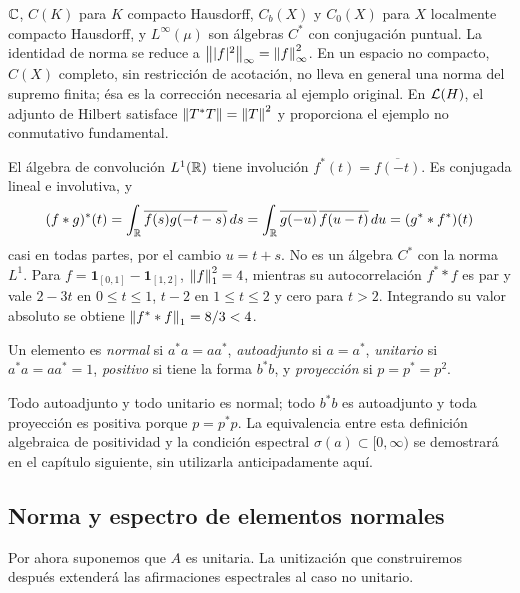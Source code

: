 \begin{ejemplo}
$\mathbb C$, $C(K)$ para $K$ compacto Hausdorff, $C_b(X)$ y $C_0(X)$ para $X$ localmente compacto Hausdorff, y $L^\infty(\mu)$ son álgebras $C^*$ con conjugación puntual. La identidad de norma se reduce a $\left\lVert|f|^2\right\rVert_\infty=\left\lVert f\right\rVert_\infty^2$. En un espacio no compacto, $C(X)$ completo, sin restricción de acotación, no lleva en general una norma del supremo finita; ésa es la corrección necesaria al ejemplo original. En $\mathcal L(H)$, el adjunto de Hilbert satisface $\left\lVert T^*T\right\rVert=\left\lVert T\right\rVert^2$ y proporciona el ejemplo no conmutativo fundamental.

El álgebra de convolución $L^1(\mathbb R)$ tiene involución $f^*(t)=\overline{f(-t)}$. Es conjugada lineal e involutiva, y
\[
 (f*g)^*(t)=\int_{\mathbb R}\overline{f(s)g(-t-s)}\,ds
 =\int_{\mathbb R}\overline{g(-u)}\,\overline{f(u-t)}\,du
 =(g^**f^*)(t)
\]
casi en todas partes, por el cambio $u=t+s$. No es un álgebra $C^*$ con la norma $L^1$. Para $f=\mathbf1_{[0,1]}-\mathbf1_{[1,2]}$, $\left\lVert f\right\rVert_1^2=4$, mientras su autocorrelación $f^**f$ es par y vale $2-3t$ en $0\le t\le1$, $t-2$ en $1\le t\le2$ y cero para $t>2$. Integrando su valor absoluto se obtiene $\left\lVert f^**f\right\rVert_1=8/3<4$.
\end{ejemplo}

\begin{definicion}
Un elemento es \emph{normal} si $a^*a=aa^*$, \emph{autoadjunto} si $a=a^*$, \emph{unitario} si $a^*a=aa^*=1$, \emph{positivo} si tiene la forma $b^*b$, y \emph{proyección} si $p=p^*=p^2$.
\end{definicion}

Todo autoadjunto y todo unitario es normal; todo $b^*b$ es autoadjunto y toda proyección es positiva porque $p=p^*p$. La equivalencia entre esta definición algebraica de positividad y la condición espectral $\sigma(a)\subset[0,\infty)$ se demostrará en el capítulo siguiente, sin utilizarla anticipadamente aquí.

\subsection{Norma y espectro de elementos normales}
Por ahora suponemos que $A$ es unitaria. La unitización que construiremos después extenderá las afirmaciones espectrales al caso no unitario.

